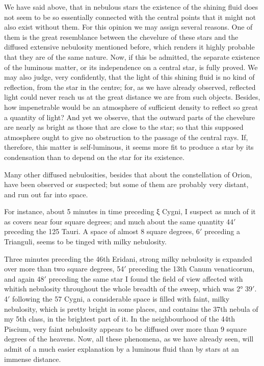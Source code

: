 \documentclass[a4paper, 12pt, oneside, polutonikogreek, english]{article}
\begin{document}
We have said above, that in nebulous stars the existence of the shining fluid does not seem to be so essentially connected with the central points that it might not also exist without them. For this opinion we may assign several reasons. One of them is the great resemblance between the chevelure of these stars and the diffused extensive nebulosity mentioned before, which renders it highly probable that they are of the same nature. Now, if this be admitted, the separate existence of the luminous matter, or its independence on a central star, is fully proved. We may also judge, very confidently, that the light of this shining fluid is no kind of reflection, from the star in the centre; for, as we have already observed, reflected light could never reach us at the great distance we are from such objects. Besides, how impenetrable would be an atmosphere of sufficient density to reflect so great a quantity of light? And yet we observe, that the outward parts of the chevelure are nearly as bright as those that are close to the star; so that this supposed atmosphere ought to give no obstruction to the passage of the central rays. If, therefore, this matter is self-luminous, it seems more fit to produce a star by its condensation than to depend on the star for its existence.

Many other diffused nebulosities, besides that about the constellation of Orion, have been observed or suspected; but some of them are probably very distant, and run out far into space.

For instance, about 5 minutes in time preceding ξ Cygni, I suspect as much of it as covers near four square degrees; and much about the same quantity 44$\prime$ preceding the 125 Tauri. A space of almost 8 square degrees, 6$\prime$ preceding a Trianguli, seems to be tinged with milky nebulosity.

Three minutes preceding the 46th Eridani, strong milky nebulosity is expanded over more than two square degrees, 54$\prime$ preceding the 13th Canum venaticorum, and again 48$\prime$ preceding the same star I found the field of view affected with whitish nebulosity throughout the whole breadth of the sweep, which was 2° 39$\prime$. 4$\prime$ following the 57 Cygni, a considerable space is filled with faint, milky nebulosity, which is pretty bright in some places, and contains the 37th nebula of my 5th class, in the brightest part of it. In the neighbourhood of the 44th Piscium, very faint nebulosity appears to be diffused over more than 9 square degrees of the heavens. Now, all these phenomena, as we have already seen, will admit of a much easier explanation by a luminous fluid than by stars at an immense distance.
\end{document}

